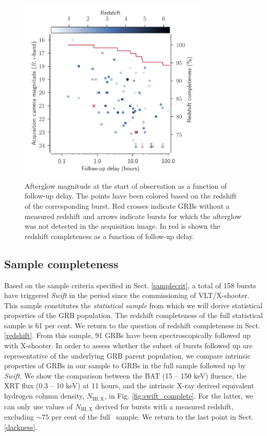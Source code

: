 \documentclass{aa}    %
\begin{document}
\begin{figure}
	\centerline{\includegraphics[width=9cm]{figures/timing.pdf}} \caption{Afterglow
	magnitude at the start of observation as a function of follow-up delay. The
	points have been colored based on the redshift of the corresponding burst. Red
	crosses indicate GRBs without a measured redshift and arrows indicate bursts
	for which the afterglow was not detected in the acquisition image. In red is
	shown the redshift completeness as a function of follow-up delay.}
\label{fig:timing}
\end{figure}
\subsection{Sample completeness} \label{completeness}

Based on the sample criteria specified in Sect. \ref{samplecrit}, a total of 158
bursts have triggered \textit{Swift} in the period since the commissioning of
VLT/X-shooter. This sample constitutes the \textit{statistical sample} from
which we will derive statistical properties of the GRB population. The redshift
completeness of the full statistical sample is 61 per cent. We return to the
question of redshift completeness in Sect. \ref{redshift}. From this sample, 91
GRBs have been spectroscopically followed up with X-shooter. In order to assess
whether the subset of bursts followed up are representative of the underlying
GRB parent population, we compare intrinsic properties of GRBs in our sample to
GRBs in the full sample followed up by \textit{Swift}. We show the comparison
between the BAT (15 -- 150 keV) fluence, the XRT flux (0.3 -- 10 keV) at 11
hours, and the intrinsic X-ray derived equivalent hydrogen column density,
$N_{\mathrm{HI,X}}$, in Fig. \ref{fig:swift_complete}. For the latter, we can
only use values of $N_{\mathrm{HI,X}}$ derived for bursts with a measured
redshift, excluding $\sim 75$ per cent of the full \swift~sample. We return to
the last point in Sect. \ref{darkness}.
\end{document}
